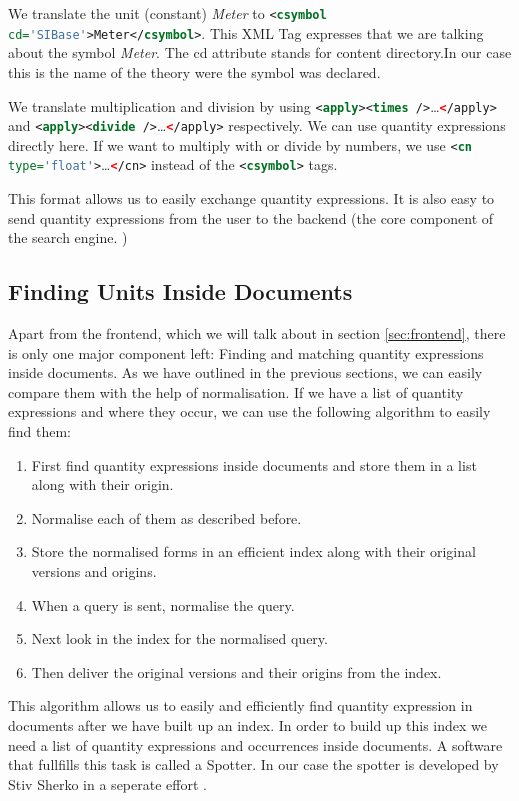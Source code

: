 We translate the unit (constant) \textit{Meter} to \lstinline[language=XML]{<csymbol cd='SIBase'>Meter</csymbol>}. This XML Tag expresses that we are talking about the symbol \textit{Meter}. The cd attribute stands for content directory.In our case this is the name of the theory were the symbol was declared.

We translate multiplication and division by using \lstinline[language=XML]{<apply><times />}\dots\lstinline[language=XML]{</apply>} and \lstinline[language=XML]{<apply><divide />}\dots\lstinline[language=XML]{</apply>} respectively. We can use quantity expressions directly here. If we want to multiply with or divide by numbers, we use \lstinline[language=XML]{<cn type='float'>}\dots\lstinline[language=XML]{</cn>} instead of the \lstinline[language=XML]{<csymbol>} tags.

This format allows us to easily exchange quantity expressions. It is also easy to send quantity expressions from the user to the backend (the core component of the search engine. )

\subsection{Finding Units Inside Documents}
Apart from the frontend, which we will talk about in section \ref{sec:frontend}, there is only one major component left: Finding and matching quantity expressions inside documents. As we have outlined in the previous sections, we can easily compare them with the help of normalisation. If we have a list of quantity expressions and where they occur, we can use the following algorithm to easily find them:
\begin{enumerate}
  \item First find quantity expressions inside documents and store them in a list along with their origin.
  \item Normalise each of them as described before.
  \item Store the normalised forms in an efficient index along with their original versions and origins.
  \item When a query is sent, normalise the query.
  \item Next look in the index for the normalised query.
  \item Then deliver the original versions and their origins from the index.
\end{enumerate}
This algorithm allows us to easily and efficiently find quantity expression in documents after we have built up an index. In order to build up this index we need a list of quantity expressions and occurrences inside documents. A software that fullfills this task is called a Spotter. In our case the spotter is developed by Stiv Sherko in a seperate effort \cite{proposal:sharko}.
